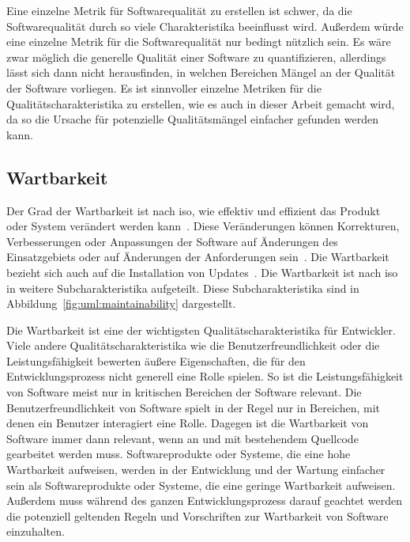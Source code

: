 \documentclass[12pt, a4paper, ngerman]{article}
\begin{document}
Eine einzelne Metrik für Softwarequalität zu erstellen ist schwer,
da die Softwarequalität durch so viele Charakteristika beeinflusst wird.
Außerdem würde eine einzelne Metrik für die Softwarequalität nur bedingt nützlich sein.
Es wäre zwar möglich die generelle Qualität einer Software zu quantifizieren,
allerdings lässt sich dann nicht herausfinden, 
in welchen Bereichen Mängel an der Qualität der Software vorliegen.
Es ist sinnvoller einzelne Metriken für die Qualitätscharakteristika
zu erstellen, wie es auch in dieser Arbeit gemacht wird,
da so die Ursache für potenzielle Qualitätsmängel
einfacher gefunden werden kann.


\subsection{Wartbarkeit}

Der Grad der Wartbarkeit ist nach \ac{iso},
wie effektiv und effizient das Produkt oder System verändert werden kann~\cite{ISO25010}.
Diese Veränderungen können Korrekturen, Verbesserungen
oder Anpassungen der Software auf Änderungen des Einsatzgebiets
oder auf Änderungen der Anforderungen sein~\cite{ISO25010}.
Die Wartbarkeit bezieht sich auch auf die Installation von Updates~\cite{ISO25010}.
Die Wartbarkeit ist nach \ac{iso} in weitere Subcharakteristika aufgeteilt.
Diese Subcharakteristika sind in Abbildung~\ref{fig:uml:maintainability} dargestellt.

Die Wartbarkeit ist eine der wichtigsten Qualitätscharakteristika für Entwickler.
Viele andere Qualitätscharakteristika wie 
die Benutzerfreundlichkeit oder die Leistungsfähigkeit
bewerten äußere Eigenschaften,
die für den Entwicklungsprozess nicht generell eine Rolle spielen.
So ist die Leistungsfähigkeit von Software 
meist nur in kritischen Bereichen der Software relevant.
Die Benutzerfreundlichkeit von Software spielt 
in der Regel nur in Bereichen, mit denen ein Benutzer interagiert eine Rolle.
Dagegen ist die Wartbarkeit von Software
immer dann relevant, 
wenn an und mit bestehendem Quellcode gearbeitet werden muss.
Softwareprodukte oder Systeme,
die eine hohe Wartbarkeit aufweisen,
werden in der Entwicklung und der Wartung einfacher sein
als Softwareprodukte oder Systeme,
die eine geringe Wartbarkeit aufweisen.
Außerdem muss während des ganzen Entwicklungsprozess
darauf geachtet werden die potenziell geltenden 
Regeln und Vorschriften zur Wartbarkeit von Software einzuhalten.
\end{document}
